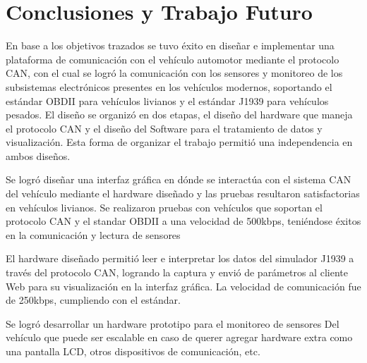 \chapter[Conclusiones y Trabajo Futuro]{Conclusiones y Trabajo Futuro}

En base  a los objetivos trazados se tuvo éxito en diseñar e implementar una plataforma de comunicación con el vehículo automotor mediante el protocolo CAN, con el cual se logró la comunicación con los sensores y monitoreo de los subsistemas electrónicos presentes en los vehículos modernos, soportando el estándar OBDII para vehículos livianos y el estándar J1939 para vehículos pesados. 
El diseño se organizó en dos etapas, el diseño del hardware que maneja el protocolo CAN y el diseño del Software para el tratamiento de datos y visualización. 
Esta forma de organizar el trabajo permitió una independencia en ambos diseños. 

Se logró diseñar una interfaz gráfica en dónde se interactúa con el sistema CAN del vehículo mediante el hardware diseñado y las pruebas resultaron satisfactorias en vehículos livianos. 
Se realizaron pruebas con vehículos que soportan el protocolo CAN y el standar OBDII a una velocidad de 500kbps, teniéndose éxitos en la comunicación y lectura de sensores


El hardware diseñado permitió leer e interpretar los datos  del simulador J1939 a través del protocolo CAN, logrando la captura y envió de parámetros al cliente Web para su visualización en la interfaz gráfica. 
La velocidad de comunicación fue de 250kbps, cumpliendo con el estándar. 

Se logró desarrollar un hardware prototipo para el monitoreo de sensores Del vehículo que puede ser escalable en caso de querer agregar hardware extra como una pantalla LCD, otros dispositivos de comunicación, etc. 

